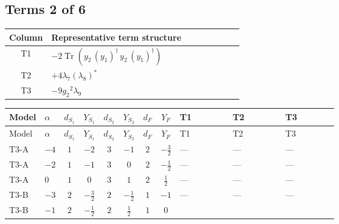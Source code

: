 \documentclass[8pt]{article}
\begin{document}
\begin{landscape}
\subsection*{Terms 2 of 6}
\begin{center}
\begin{tabular}{@{}c >{\raggedright\arraybackslash}p{0.82\linewidth}@{}}
\toprule
Column & Representative term structure \\
\midrule
T1 & \(\displaystyle -2 \operatorname{Tr}\!\left({y_2}\,\left({y_1}\right)^{\dagger}\,{y_2}\,\left({y_1}\right)^{\dagger}\right)\) \\
\midrule
T2 & \(\displaystyle +4 {\lambda_{7}} \left({\lambda_{8}}\right)^{*}\) \\
\midrule
T3 & \(\displaystyle -9 {g_2}^2 {\lambda_{9}}\) \\
\midrule
\bottomrule
\end{tabular}
\end{center}
\smallskip
\tiny
\begin{longtable}{@{}llcccccc >{\raggedright\arraybackslash}p{0.21\linewidth} >{\raggedright\arraybackslash}p{0.21\linewidth} >{\raggedright\arraybackslash}p{0.21\linewidth}@{}}
\toprule
Model & $\alpha$ & $d_{S_1}$ & $Y_{S_1}$ & $d_{S_2}$ & $Y_{S_2}$ & $d_F$ & $Y_F$ & T1 & T2 & T3 \\
\midrule
\endfirsthead
\toprule
Model & $\alpha$ & $d_{S_1}$ & $Y_{S_1}$ & $d_{S_2}$ & $Y_{S_2}$ & $d_F$ & $Y_F$ & T1 & T2 & T3 \\
\midrule
\endhead
T3-A & $-4$ & $1$ & $-2$ & $3$ & $-1$ & $2$ & $-\frac{3}{2}$ & --- & --- & --- \\
\midrule
T3-A & $-2$ & $1$ & $-1$ & $3$ & $0$ & $2$ & $-\frac{1}{2}$ & --- & --- & --- \\
\midrule
T3-A & $0$ & $1$ & $0$ & $3$ & $1$ & $2$ & $\frac{1}{2}$ & --- & --- & --- \\
\midrule
T3-B & $-3$ & $2$ & $-\frac{3}{2}$ & $2$ & $-\frac{1}{2}$ & $1$ & $-1$ & --- & --- & --- \\
\midrule
T3-B & $-1$ & $2$ & $-\frac{1}{2}$ & $2$ & $\frac{1}{2}$ & $1$ & $0$ & \scriptsize\adjustbox{max width=\linewidth}{$\begin{gathered} -2 \operatorname{Tr}\!\left({y_2}\,\left({y_1}\right)^{\dagger}\,{y_2}\,\left({y_1}\right)^{\dagger}\right)\end{gathered}$} & \scriptsize\adjustbox{max width=\linewidth}{$\begin{gathered} +4 {\lambda_{7}} \left({\lambda_{8}}\right)^{*}\end{gathered}$} & \scriptsize\adjustbox{max width=\linewidth}{$\begin{gathered} -9 {g_2}^2 {\lambda_{9}}\end{gathered}$} \\

\end{longtable}
\end{landscape}
\end{document}
